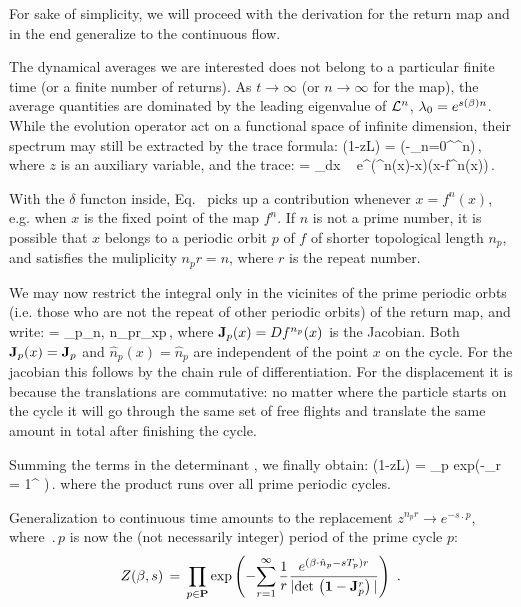 For sake of simplicity, we will proceed with the derivation for the
return map and in the end generalize to the continuous flow.

The dynamical averages we are interested does not belong to a
particular finite time (or a finite number of returns). As
$t\to\infty$ (or $n\to\infty$ for the map), the average quantities are
dominated by the leading eigenvalue of ${\cal L}^n$, $\lambda_0 =
e^{s(\beta)n}$. While the evolution operator
 act on a functional space of
infinite dimension, their spectrum may still be extracted by the trace
formula:
\beq
\det(1-z{\cal L}) =
\exp\left(-\sum_{n=0}^{\infty}^n\right)\,,
\label{eq-det-disci}
\eeq
where $z$ is an auxiliary variable, and the trace:
\beq
{} = \int_{\pS}dx ~
e^{\beta\cdot(^n(x)-x)}\delta(x-f^n(x))\,.
\label{eq-trace-disc}
\eeq

With the $\delta$ functon inside, Eq.~ picks up a
contribution whenever $x = f^n(x)$, e.g. when $x$ is the fixed point
of the map $f^n$. If $n$ is not a prime number, it is possible that
$x$ belongs to a periodic orbit $p$ of $f$ of shorter topological
length $n_p$, and satisfies the muliplicity $n_p r = n$, where $r$ is
the repeat number.

We may now restrict the integral only in the vicinites of the prime
periodic orbts (i.e. those who are not the repeat of other periodic
orbits) of the return map, and write:
\beq
{} = \sum_p\delta_{n,
n_pr}\sum_{x\in p}\,,
\label{eq-trace-expan}
\eeq 
where ${\bf J}_p(x) = Df^{n_p}(x)$ is the Jacobian.  Both ${\bf
J}_p(x) = {\bf J}_p $ and $\hat{n}_p(x) = \hat{n}_p$ are independent
of the point $x$ on the cycle. For the jacobian this follows by the
chain rule of differentiation. For the displacement it is because the
translations are commutative: no matter where the particle starts on
the cycle it will go through the same set of free flights and
translate the same amount in total after finishing the cycle. 

Summing the terms in the determinant , we finally
obtain:
\beq
\det(1-z{\cal L}) = \prod_p exp\left(-\sum_{r =
1}^{\infty}
\right)\,.
\eeq
where the product runs over all prime periodic cycles.

Generalization to continuous time amounts to the
replacement
$ z^{n_p r} \rightarrow e^{-s \period{p}} $, where $\period{p}$
is now the (not necessarily integer)
period of the prime cycle $p$:
$$
Z(\beta,s)\,=\,\prod_{p\in\PP} \exp \left( - {
 \sum_{r=1}^\infty {1 \over r}
 { e^{(\beta \cdot \hn_p- s \period{p}) r } %
 \over { | \det \left( {\bf 1}-{\bf J}_p^{r} \right) | } }
 } \right)
\,\, .
$$

